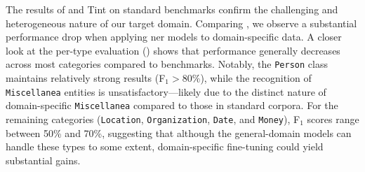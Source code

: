 The results of \spacy and Tint on standard benchmarks confirm the challenging and heterogeneous nature of our target domain. Comparing , we observe a substantial performance drop when applying \ac{ner} models to domain-specific data. A closer look at the per-type evaluation () shows that performance generally decreases across most categories compared to benchmarks. Notably, the \texttt{Person} class maintains relatively strong results (F$_1 > 80\%$), while the recognition of \texttt{Miscellanea} entities is unsatisfactory---likely due to the distinct nature of domain-specific \texttt{Miscellanea} compared to those in standard corpora. For the remaining categories (\texttt{Location}, \texttt{Organization}, \texttt{Date}, and \texttt{Money}), F$_1$ scores range between 50\% and 70\%, suggesting that although the general-domain models can handle these types to some extent, domain-specific fine-tuning could yield substantial gains.




